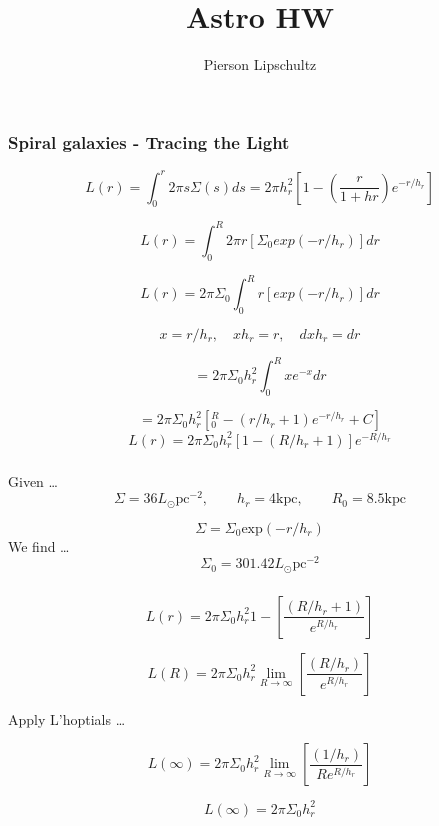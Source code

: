 \documentclass{article}
\title{Astro HW \hwNUM}
\author{Pierson Lipschultz}
\def\hwNUM{11}
\begin{document}
\maketitle
\setcounter{section}{\hwNUM}

\subsection{}

\subsubsection{Spiral galaxies - Tracing the Light}
\[L(r) = \int_{0}^{r} 2 \pi s \Sigma (s)ds = 2 \pi h^2_r \left[1 - \left(\frac{r}{1+hr}\right)e^{-r/h_r}\right]\]

\[L(r) = \int_{0}^{R} 2 \pi r \left[\Sigma_0 exp(-r/h_r)\right]dr \]


\[L(r) = 2\pi \Sigma_0 \int_{0}^{R} r \left[exp(-r/h_r)\right] dr \]

\[x = r/h_r, \quad xh_r =r, \quad dxh_r = dr\]

\[ = 2\pi \Sigma_0 h_r^2 \int_{0}^{R}xe^{-x} dr \]

\[ = 2\pi \Sigma_0 h_r^2\left[_0^R - (r/h_r + 1)e^{-r/h_r} + C \right]\]
\[ L(r) = 2\pi \Sigma_0 h_r^2\left[1 - (R/h_r +1 ) \right]e^{-R/h_r}\]


\subsubsection{}
Given \dots
\[\Sigma = 36 L_\odot \text{pc}^{-2}, \qquad h_r = 4\text{kpc}, \qquad R_0 = 8.5\text{kpc}\]

\[\Sigma = \Sigma_0 \text{exp}(-r/h_r)\]
We find \dots
\[\Sigma_ 0 = 301.42 L_\odot \text{pc}^{-2}\]

\subsubsection{}

\[ L(r) = 2\pi \Sigma_0 h_r^2 1 - \left[\frac{(R/h_r +1 )}{e^{R/h_r}} \right]\]

\[ L(R) = 2\pi \Sigma_0 h_r^2 \lim_{R \rightarrow \infty} \left[\frac{(R/h_r )}{e^{R/h_r}} \right]\]

Apply L'hoptials \dots 

\[ L(\infty) = 2\pi \Sigma_0 h_r^2 \lim_{R \rightarrow \infty} \left[\frac{(1/h_r )}{Re^{R/h_r}} \right]\]

\[ L(\infty) = 2\pi \Sigma_0 h_r^2\]
\end{document}
